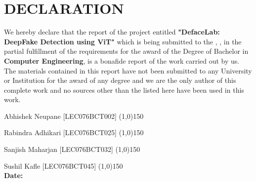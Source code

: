 \section*{DECLARATION}

We hereby declare that the report of the project entitled \textbf{"DefaceLab:  DeepFake Detection using ViT"} which is
being submitted to the \textbf{\thedepartment}, \textbf{\thecampus}, in the partial fulfillment of the requirements for the award
of the Degree of Bachelor in \textbf{Computer Engineering}, is a bonafide report of the work carried out by us. The materials
contained in this report have not been submitted to any University or Institution for
the award of any degree and we are the only author of this complete work and no
sources other than the listed here have been used in this work.

\vspace{2cm}
\noindent Abhishek Neupane [LEC076BCT002] \space{}\space{}\space{}\space{}\space{}\space{}  \line(1,0){150}\\
\vspace{0.1cm}

\noindent Rabindra Adhikari [LEC076BCT025] \space{}\space{}\space{}\space{}\space{}\space{}\space{} \line(1,0){150} \\
\vspace{0.1cm}

\noindent Sanjish Maharjan [LEC076BCT032]\space{}\space{}\space{}\space{}\space{}\space{}\space{}\space{}\space{} \line(1,0){150} \\
\vspace{0.1cm}

\noindent Sushil Kafle [LEC076BCT045]\space{}\space{}\space{}\space{}\space{}\space{}\space{}\space{} \space{}\space{}\space{}\space{}\space{}\space{}\space{}\space{}\space{}\line(1,0){150}\\


\vspace{0.7cm}
\noindent \textbf{Date: }\thedate \\
